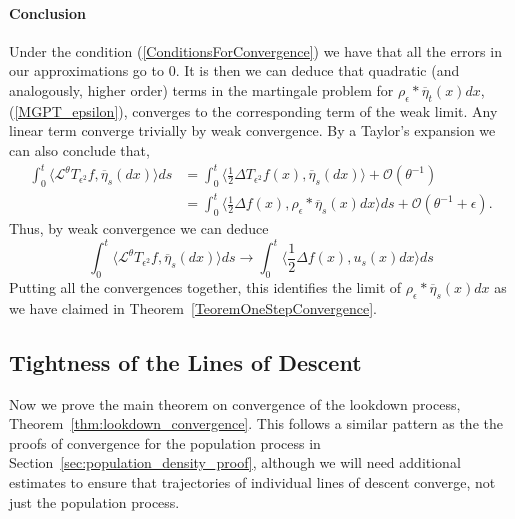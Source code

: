 \documentclass[12pt]{article}
\begin{document}
\paragraph{Conclusion}
Under the condition (\ref{ConditionsForConvergence}) we have that all the errors in our approximations go to $0$. It is then we can deduce that quadratic (and analogously, higher order) terms in the martingale problem for $\rho_\epsilon*\overline{\eta}_t(x)dx$, (\ref{MGPT_epsilon}), converges to the corresponding term of the weak limit. Any linear term converge trivially by weak convergence. By a Taylor's expansion we can also conclude that,
\begin{align*}
\int_0^t \langle \mathcal{L}^\theta T_{\epsilon^2} f, \overline{\eta}_s(dx)\rangle ds &= \int_0^t \langle \frac{1}{2} \Delta T_{\epsilon^2} f(x), \overline{\eta}_s(dx) \rangle + \mathcal{O}(\theta^{-1}) 
\\ &= \int_0^t \langle \frac{1}{2} \Delta f(x), \rho_\epsilon* \overline{\eta}_s(x) dx \rangle ds + \mathcal{O}(\theta^{-1} + \epsilon).
\end{align*}
Thus, by weak convergence we can deduce
\[ \int_0^t \langle \mathcal{L}^\theta T_{\epsilon^2} f, \overline{\eta}_s(dx)\rangle ds \rightarrow \int_0^t \langle \frac{1}{2} \Delta f(x), u_s(x) dx \rangle ds \]
Putting all the convergences together, this identifies the limit of $\rho_\epsilon*\overline{\eta}_s(x)dx$ as we have claimed in Theorem~\ref{TeoremOneStepConvergence}.





\subsection{Tightness of the Lines of Descent}
    \label{sec:lookdown_convergence}

Now we prove the main theorem on convergence of the lookdown process, 
Theorem~\ref{thm:lookdown_convergence}.
This follows a similar pattern as the the proofs of convergence for the population process
in Section~\ref{sec:population_density_proof},
although we will need additional estimates to ensure that
trajectories of individual lines of descent converge,
not just the population process.
\end{document}

